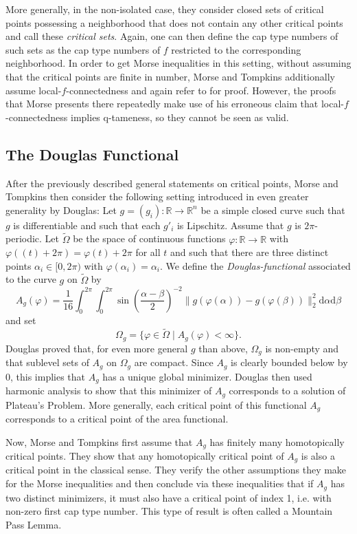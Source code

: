 More generally, in the non-isolated case, they consider closed sets of critical points possessing a neighborhood that does not contain any other critical points and call these \emph{critical sets}. Again, one can then define the cap type numbers of such sets as the cap type numbers of $f$ restricted to the corresponding neighborhood. In order to get Morse inequalities in this setting, without assuming that the critical points are finite in number, Morse and Tompkins additionally assume local-$f$-connectedness and again refer to \cite{Morse.1940} for proof. However, the proofs that Morse presents there repeatedly make use of his erroneous claim that local-$f$-connectedness implies q-tameness, so they cannot be seen as valid.

\subsection{The Douglas Functional}
After the previously described general statements on critical points, Morse and Tompkins then consider the following setting introduced in even greater generality by Douglas: Let $g=(g_i)\colon\mathbb{R}\to\mathbb{R}^n$ be a simple closed curve such that $g$ is differentiable and such that each $g'_i$ is Lipschitz. Assume that $g$ is $2\pi$-periodic. Let $\tilde{\Omega}$ be the space of continuous functions $\varphi\colon\mathbb{R}\to\mathbb{R}$ with $\varphi((t)+2\pi)=\varphi(t)+2\pi$ for all $t$ and such that there are three distinct points $\alpha_i\in[0,2\pi)$ with $\varphi(\alpha_i)=\alpha_i$. We define the \emph{Douglas-functional} associated to the curve $g$ on $\tilde{\Omega}$ by $$A_g(\varphi)=\frac{1}{16}\int_0^{2\pi}\int_0^{2\pi}\sin\left(\frac{\alpha-\beta}{2}\right)^{-2}\lVert g(\varphi(\alpha))-g(\varphi(\beta)) \rVert_2^2\mathrm{d}\alpha\mathrm{d}\beta$$ and set $$\Omega_g=\{\varphi\in\tilde\Omega\mid A_g(\varphi)<\infty\}.$$ Douglas proved that, for even more general $g$ than above, $\Omega_g$ is non-empty and that sublevel sets of $A_g$ on $\Omega_g$ are compact. Since $A_g$ is clearly bounded below by $0$, this implies that $A_g$ has a unique global minimizer. Douglas then used harmonic analysis to show that this minimizer of $A_g$ corresponds to a solution of Plateau's Problem. More generally, each critical point of this functional $A_g$ corresponds to a critical point of the area functional. 

Now, Morse and Tompkins first assume that $A_g$ has finitely many homotopically critical points. They show that any homotopically critical point of $A_g$ is also a critical point in the classical sense. They verify the other assumptions they make for the Morse inequalities and then conclude via these inequalities that if $A_g$ has two distinct minimizers, it must also have a critical point of index 1, i.e. with non-zero first cap type number. This type of result is often called a Mountain Pass Lemma. 

